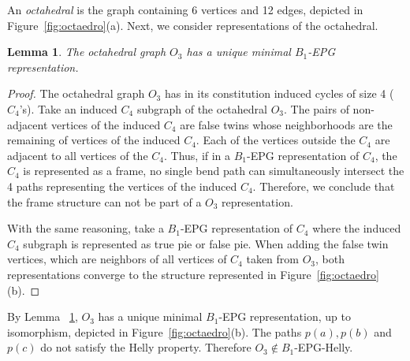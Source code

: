 \documentclass[preprint,12pt]{elsarticle} %
\newtheorem{lema}[theorem]{Lemma}
\newtheorem{coro}[theorem]{Corollary}
\begin{document}
An \textit{octahedral} is the graph containing 6 vertices and 12 edges, depicted  in Figure~\ref{fig:octaedro}(a). Next, we consider representations of the octahedral.

\begin{lema}\label{lem:octaedronaohelly}
The octahedral graph $O_3$ has a unique minimal  $ B_1$-EPG representation.%
\end{lema}
\begin{proof}
The octahedral graph $ O_3 $ has in its constitution induced cycles of size 4 ($ C_4$'s). 
Take an induced $ C_4 $ subgraph  of the octahedral $ O_3 $. The pairs of non-adjacent vertices of the induced $C_4$ are false twins whose neighborhoods are the remaining of vertices of the induced $C_4$. Each of the vertices outside the $C_4$ are adjacent to all vertices of the $C_4$. Thus, if in a $ B_1$-EPG representation of $C_4$, the $ C_4 $ is represented as a frame, no single bend path can simultaneously intersect the 4 paths representing the vertices of the induced $ C_4 $. Therefore, we conclude that the frame structure can not be part of a $ O_3 $ representation.

With the same reasoning, take a $ B_1$-EPG representation of $C_4$ where the induced $ C_4 $ subgraph is represented as true pie or false pie. When adding the false twin vertices, which are neighbors of all vertices of $ C_4 $ taken from $ O_3 $, both representations converge to the structure represented in Figure~\ref{fig:octaedro}(b). 
\end{proof}



By Lemma ~\ref{lem:octaedronaohelly},  $ O_3 $ has a unique minimal $B_1$-EPG representation, up to isomorphism, depicted in Figure~\ref{fig:octaedro}(b). The paths $ p(a), p(b) $ and $ p(c) $  do not satisfy the Helly property. Therefore $O_3 \notin B_1$-EPG-Helly. %


\end{document}
